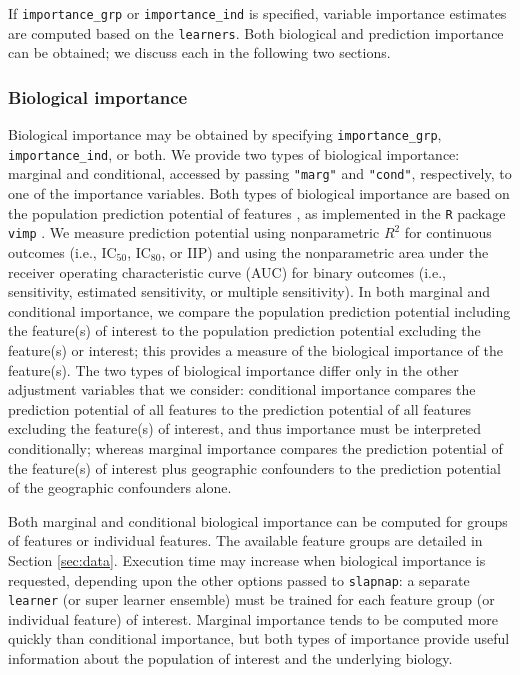 \documentclass[]{article}
\begin{document}
If \texttt{importance\_grp} or \texttt{importance\_ind} is specified,
variable importance estimates are computed based on the
\texttt{learners}. Both biological and prediction importance can be
obtained; we discuss each in the following two sections.

\subsubsection{Biological importance}\label{sec:biolimp}

Biological importance may be obtained by specifying
\texttt{importance\_grp}, \texttt{importance\_ind}, or both. We provide
two types of biological importance: marginal and conditional, accessed
by passing \texttt{"marg"} and \texttt{"cond"}, respectively, to one of
the importance variables. Both types of biological importance are based
on the population prediction potential of features
\citep{williamson2020}, as implemented in the \texttt{R} package
\texttt{vimp} \citep{vimppkg}. We measure prediction potential using
nonparametric \(R^2\) for continuous outcomes (i.e., IC\(_{50}\),
IC\(_{80}\), or IIP) and using the nonparametric area under the receiver
operating characteristic curve (AUC) for binary outcomes (i.e.,
sensitivity, estimated sensitivity, or multiple sensitivity). In both
marginal and conditional importance, we compare the population
prediction potential including the feature(s) of interest to the
population prediction potential excluding the feature(s) or interest;
this provides a measure of the biological importance of the feature(s).
The two types of biological importance differ only in the other
adjustment variables that we consider: conditional importance compares
the prediction potential of all features to the prediction potential of
all features excluding the feature(s) of interest, and thus importance
must be interpreted conditionally; whereas marginal importance compares
the prediction potential of the feature(s) of interest plus geographic
confounders to the prediction potential of the geographic confounders
alone.

Both marginal and conditional biological importance can be computed for
groups of features or individual features. The available feature groups
are detailed in Section \ref{sec:data}. Execution time may increase when
biological importance is requested, depending upon the other options
passed to \texttt{slapnap}: a separate \texttt{learner} (or super
learner ensemble) must be trained for each feature group (or individual
feature) of interest. Marginal importance tends to be computed more
quickly than conditional importance, but both types of importance
provide useful information about the population of interest and the
underlying biology.
\end{document}
